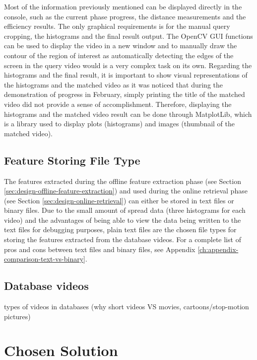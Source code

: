 Most of the information previously mentioned can be displayed directly in the console, such as the current phase progress, the distance measurements and the efficiency results. The only graphical requirements is for the manual query cropping, the histograms and the final result output. The OpenCV GUI functions can be used to display the video in a new window and to manually draw the contour of the region of interest as automatically detecting the edges of the screen in the query video would is a very complex task on its own. Regarding the histograms and the final result, it is important to show visual representations of the histograms and the matched video as it was noticed that during the demonstration of progress in February, simply printing the title of the matched video did not provide a sense of accomplishment. Therefore, displaying the histograms and the matched video result can be done through MatplotLib, which is a library used to display plots (histograms) and images (thumbnail of the matched video).

\subsection{Feature Storing File Type}

The features extracted during the offline feature extraction phase (see Section \ref{sec:design-offline-feature-extraction}) and used during the online retrieval phase (see Section \ref{sec:design-online-retrieval}) can either be stored in text files or binary files. Due to the small amount of spread data (three histograms for each video) and the advantages of being able to view the data being written to the text files for debugging purposes, plain text files are the chosen file types for storing the features extracted from the database videos. For a complete list of pros and cons between text files and binary files, see Appendix \ref{ch:appendix-comparison-text-vs-binary}.

\subsection{Database videos}

types of videos in databases (why short videos VS movies, cartoons/stop-motion pictures)

\section{Chosen Solution}

